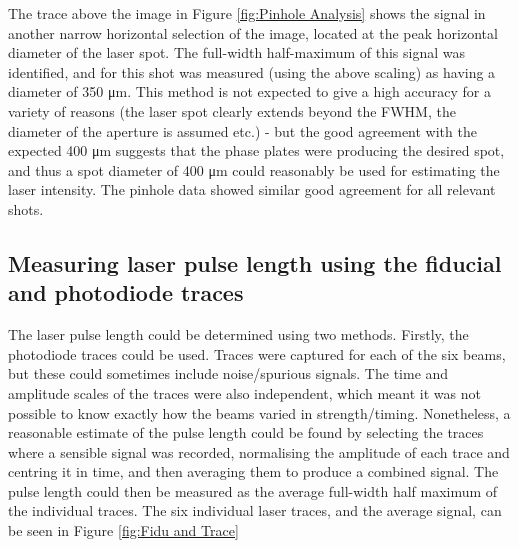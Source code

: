 The trace above the image in Figure \ref{fig:Pinhole Analysis} shows the signal in another narrow horizontal selection of the image, located at the peak horizontal diameter of the laser spot. The full-width half-maximum of this signal was identified, and for this shot was measured (using the above scaling) as having a diameter of 350 \unit{\micro\meter}. This method is not expected to give a high accuracy for a variety of reasons (the laser spot clearly extends beyond the FWHM, the diameter of the aperture is assumed etc.) - but the good agreement with the expected 400 \unit{\micro\meter} suggests that the phase plates were producing the desired spot, and thus a spot diameter of 400 \unit{\micro\meter} could reasonably be used for estimating the laser intensity. The pinhole data showed similar good agreement for all relevant shots.

\subsection{Measuring laser pulse length using the fiducial and photodiode traces} \label{Estimating pulse length}

The laser pulse length could be determined using two methods. Firstly, the photodiode traces could be used. Traces were captured for each of the six beams, but these could sometimes include noise/spurious signals. The time and amplitude scales of the traces were also independent, which meant it was not possible to know exactly how the beams varied in strength/timing. Nonetheless, a reasonable estimate of the pulse length could be found by selecting the traces where a sensible signal was recorded, normalising the amplitude of each trace and centring it in time, and then averaging them to produce a combined signal. The pulse length could then be measured as the average full-width half maximum of the individual traces. The six individual laser traces, and the average signal, can be seen in Figure \ref{fig:Fidu and Trace} 

